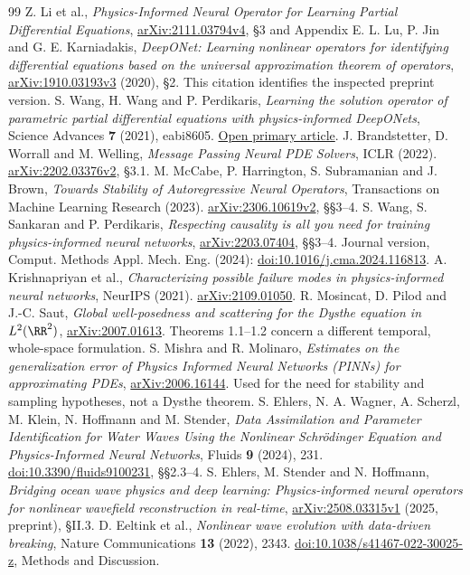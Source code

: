 \begin{thebibliography}{99}
Z. Li et al.,
\emph{Physics-Informed Neural Operator for Learning Partial Differential
Equations},
\href{https://arxiv.org/abs/2111.03794v4}{arXiv:2111.03794v4},
\S3 and Appendix E.
L. Lu, P. Jin and G. E. Karniadakis,
\emph{DeepONet: Learning nonlinear operators for identifying differential
equations based on the universal approximation theorem of operators},
\href{https://arxiv.org/abs/1910.03193v3}{arXiv:1910.03193v3} (2020),
\S2. This citation identifies the inspected preprint version.
S. Wang, H. Wang and P. Perdikaris,
\emph{Learning the solution operator of parametric partial differential
equations with physics-informed DeepONets},
Science Advances \textbf{7} (2021), eabi8605.
\href{https://pmc.ncbi.nlm.nih.gov/articles/PMC8480920/}{Open primary article}.
J. Brandstetter, D. Worrall and M. Welling,
\emph{Message Passing Neural PDE Solvers}, ICLR (2022).
\href{https://arxiv.org/abs/2202.03376v2}{arXiv:2202.03376v2}, \S3.1.
M. McCabe, P. Harrington, S. Subramanian and J. Brown,
\emph{Towards Stability of Autoregressive Neural Operators},
Transactions on Machine Learning Research (2023).
\href{https://arxiv.org/abs/2306.10619v2}{arXiv:2306.10619v2}, \S\S3--4.
S. Wang, S. Sankaran and P. Perdikaris,
\emph{Respecting causality is all you need for training physics-informed
neural networks},
\href{https://arxiv.org/abs/2203.07404}{arXiv:2203.07404}, \S\S3--4.
Journal version, Comput. Methods Appl. Mech. Eng. (2024):
\href{https://doi.org/10.1016/j.cma.2024.116813}{doi:10.1016/j.cma.2024.116813}.
A. Krishnapriyan et al.,
\emph{Characterizing possible failure modes in physics-informed neural
networks}, NeurIPS (2021).
\href{https://arxiv.org/abs/2109.01050}{arXiv:2109.01050}.
R. Mosincat, D. Pilod and J.-C. Saut,
\emph{Global well-posedness and scattering for the Dysthe equation
in $L^2(\RR^2)$},
\href{https://arxiv.org/abs/2007.01613}{arXiv:2007.01613}.
Theorems 1.1--1.2 concern a different temporal, whole-space formulation.
S. Mishra and R. Molinaro,
\emph{Estimates on the generalization error of Physics Informed Neural
Networks (PINNs) for approximating PDEs},
\href{https://arxiv.org/abs/2006.16144}{arXiv:2006.16144}.
Used for the need for stability and sampling hypotheses, not a Dysthe theorem.
S. Ehlers, N. A. Wagner, A. Scherzl, M. Klein, N. Hoffmann and M. Stender,
\emph{Data Assimilation and Parameter Identification for Water Waves
Using the Nonlinear Schr\"odinger Equation and Physics-Informed Neural
Networks}, Fluids \textbf{9} (2024), 231.
\href{https://doi.org/10.3390/fluids9100231}{doi:10.3390/fluids9100231},
\S\S2.3--4.
S. Ehlers, M. Stender and N. Hoffmann,
\emph{Bridging ocean wave physics and deep learning: Physics-informed
neural operators for nonlinear wavefield reconstruction in real-time},
\href{https://arxiv.org/abs/2508.03315v1}{arXiv:2508.03315v1}
(2025, preprint), \S II.3.
D. Eeltink et al., \emph{Nonlinear wave evolution with data-driven breaking},
Nature Communications \textbf{13} (2022), 2343.
\href{https://doi.org/10.1038/s41467-022-30025-z}{doi:10.1038/s41467-022-30025-z},
Methods and Discussion.
\end{thebibliography}

